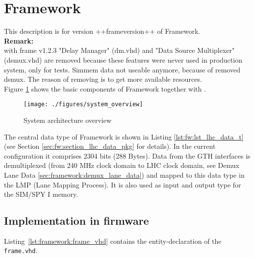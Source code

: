 \section{Framework}\label{sec:framework:framework}

This description is for version ++frameversion++ of Framework.\\

\textbf{Remark:}\\
with frame v1.2.3 "Delay Manager" (dm.vhd) and "Data Source Multiplexer" (dsmux.vhd) are removed because these features were never used in production system, only for tests.
Simmem data not useable anymore, because of removed dsmux.
The reason of removing is to get more available resources.\\

Figure \ref{fig_system_overview} shows the basic components of Framework together with \rop.

\begin{figure}[h]
\texttt{[image: ./figures/system\_overview]}
\caption{System architecture overview}
\label{fig_system_overview}
\end{figure}

The central data type of Framework is shown in Listing \ref{lst:fw:lst_lhc_data_t} (see Section \ref{sec:fw:section_lhc_data_pkg} for details). In the current configuration it comprises 2304 bits (288 Bytes). Data from the GTH interfaces is demultiplexed (from 240 MHz clock domain to LHC clock domain, see Demux Lane Data \ref{sec:framework:demux_lane_data}) and mapped to this data type in the LMP (Lane Mapping Process). It is also used as input and output type for the SIM/SPY I memory.

\subsection{Implementation in firmware}
\label{sec:framework:implementation_firmware}

Listing~\ref{lst:framework:frame_vhd} contains the entity-declaration of the \texttt{frame.vhd}.\\



